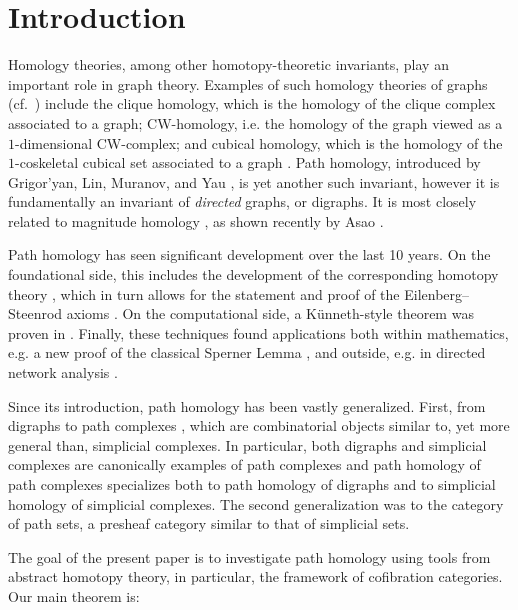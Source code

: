 \section{Introduction}

Homology theories, among other homotopy-theoretic invariants, play an important role in graph theory.
Examples of such homology theories of graphs (cf.~\cite[\S2.4]{barcelo-greene-jarraj-welker:discrete-path}) include the clique homology, which is the homology of the clique complex associated to a graph; CW-homology, i.e. the homology of the graph viewed as a $1$-dimensional CW-complex; and cubical homology, which is the homology of the $1$-coskeletal cubical set associated to a graph \cite{barcelo-capraro-white}.
Path homology, introduced by Grigor'yan, Lin, Muranov, and Yau \cite{grigor'yan-lin-muranov-yau:unpublished}, is yet another such invariant, however it is fundamentally an invariant of \emph{directed} graphs, or digraphs.
It is most closely related to magnitude homology \cite{hepworth-willerton}, as shown recently by Asao \cite{asao:magnitude-n-path}.

Path homology has seen significant development over the last 10 years.
On the foundational side, this includes the development of the corresponding homotopy theory \cite{grigor'yan-lin-muranov-yau:homotopy}, which in turn allows for the statement and proof of the Eilenberg--Steenrod axioms \cite{grigor'yan-jimenez-muranov-yau}.
On the computational side, a K{\"u}nneth-style theorem was proven in \cite{grigor'yan-muranov-yau}.
Finally, these techniques found applications both within mathematics, e.g. a new proof of the classical Sperner Lemma \cite[\S5]{grigor'yan-lin-muranov-yau:homotopy}, and outside, e.g. in directed network analysis \cite{chowdhury-memoli,chowdhury}.

Since its introduction, path homology has been vastly generalized.
First, from digraphs to path complexes \cite{grigor'yan-lin-muranov-yau}, which are combinatorial objects similar to, yet more general than, simplicial complexes.
In particular, both digraphs and simplicial complexes are canonically examples of path complexes and path homology of path complexes specializes both to path homology of digraphs and to simplicial homology of simplicial complexes.
The second generalization \cite{ivanov-pavutniskiy} was to the category of path sets, a presheaf category similar to that of simplicial sets.

The goal of the present paper is to investigate path homology using tools from abstract homotopy theory, in particular, the framework of cofibration categories.
Our main theorem is:

